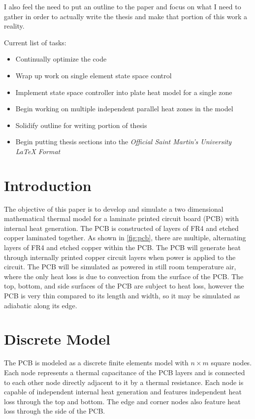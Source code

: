 \documentclass[10pt,twocolumn]{article}
\begin{document}
I also feel the need to put an outline to the paper and focus on what I need to gather in order to actually write the thesis and make that portion of this work a reality.

Current list of tasks:
\begin{itemize}
	\item Continually optimize the code
	\item Wrap up work on single element state space control
	\item Implement state space controller into plate heat model for a single zone
	\item Begin working on multiple independent parallel heat zones in the model
	\item Solidify outline for writing portion of thesis
	\item Begin putting thesis sections into the \textit{Official Saint Martin's University LaTeX Format}
\end{itemize}


\section{Introduction}
The objective of this paper is to develop and simulate a two dimensional mathematical thermal model for a laminate printed circuit board (PCB) with internal heat generation. The PCB is constructed of layers of FR4 and etched copper laminated together. As shown in \autoref{fig:pcb}, there are multiple, alternating layers of FR4 and etched copper within the PCB. The PCB will generate heat through internally printed copper circuit layers when power is applied to the circuit. The PCB will be simulated as powered in still room temperature air, where the only heat loss is due to convection from the surface of the PCB. The top, bottom, and side surfaces of the PCB are subject to heat loss, however the PCB is very thin compared to its length and width, so it may be simulated as adiabatic along its edge.

\section{Discrete Model}
The PCB is modeled as a discrete finite elements model with $n \times m$ square nodes. Each node represents a thermal capacitance of the PCB layers and is connected to each other node directly adjacent to it by a thermal resistance. Each node is capable of independent internal heat generation and features independent heat loss through the top and bottom. The edge and corner nodes also feature heat loss through the side of the PCB.
\end{document}
